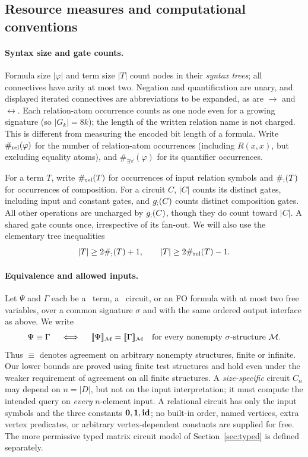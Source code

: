 \subsection{Resource measures and computational conventions}\label{sec:prelim-resources}
\paragraph{Syntax size and gate counts.}
Formula size $|\varphi|$ and term size $|T|$ count nodes in their
\emph{syntax trees}; all connectives have arity at most two. Negation
and quantification are unary, and displayed iterated connectives are
abbreviations to be expanded, as are $\to$ and $\leftrightarrow$.
Each relation-atom occurrence counts as
one node even for a growing signature (so $|G_k|=8k$); the length of
the written relation name is not charged. This is different from
measuring the encoded bit length of a formula. Write
$\#_{\mathrm{rel}}(\varphi)$ for the number of relation-atom occurrences
(including $R(x,x)$, but excluding equality atoms), and
$\#_{\exists\forall}(\varphi)$ for its quantifier occurrences.

For a term $T$, write $\#_{\mathrm{rel}}(T)$ for occurrences of input relation
symbols and $\#_{;}(T)$ for occurrences of composition. For a circuit
$C$, $|C|$ counts its distinct gates, including input and constant
gates, and $g_{;}(C)$ counts distinct composition gates. All other
operations are uncharged by $g_{;}(C)$, though they do count toward
$|C|$. A shared gate counts once, irrespective of its fan-out. We will
also use the elementary tree inequalities
\[
 |T|\ge2\#_{;}(T)+1,
 \qquad |T|\ge2\#_{\mathrm{rel}}(T)-1.
\]

\paragraph{Equivalence and allowed inputs.}
Let $\Psi$ and $\Gamma$ each be a \CoR\ term, a \CoR\ circuit, or
an FO formula with at most two free variables, over a common signature
$\sigma$ and with the same ordered output interface as above. We write
\[
 \Psi\equiv\Gamma
 \quad\iff\quad
 \llbracket \Psi\rrbracket_{\mathcal M}=\llbracket \Gamma\rrbracket_{\mathcal M}
 \quad\text{for every nonempty $\sigma$-structure $\mathcal M$.}
\]
Thus $\equiv$ denotes agreement on arbitrary nonempty structures,
finite or infinite. Our lower bounds are proved using finite test
structures and hold even under the weaker requirement of agreement on
all finite structures. A \emph{size-specific} circuit
$C_n$ may depend on $n=|D|$, but not on the input interpretation;
it must compute the intended query on \emph{every} $n$-element
input. A relational circuit has only the input symbols and the three
constants $\mathbf{0},\mathbf{1},\mathbf{id}$; no built-in order, named vertices,
extra vertex predicates, or arbitrary vertex-dependent constants are
supplied for free. The more permissive typed matrix circuit model of
Section~\ref{sec:typed} is defined separately.

